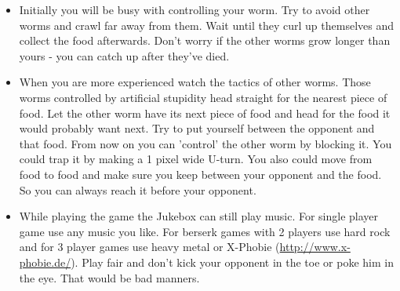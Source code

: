 \begin{itemize}

\item Initially you will be busy with controlling your worm. Try to
avoid other worms and crawl far away from them. Wait until they curl up
themselves and collect the food afterwards. Don't worry if the other worms grow longer than yours {}- you can catch up after they've died. 

\item When you are more experienced watch the tactics of other worms.
Those worms controlled by artificial stupidity head straight for the
nearest piece of food. Let the other worm have its next piece of food
and head for the food it would probably want next. Try to put yourself
between the opponent and that food. From now on you can 'control' the other worm by blocking it. You could trap it by making a 1 pixel wide U{}-turn. You also could move from food to food and make sure you keep between your opponent and
the food. So you can always reach it before your opponent. 

\item While playing the game the Jukebox can still play music. For
single player game use any music you like. For berserk games with 2 players use hard rock and for 3 player games use heavy metal or X{}-Phobie
(\url{http://www.x-phobie.de/}).
Play fair and don't kick your opponent in the toe or
poke him in the eye. That would be bad manners.
\end{itemize}

